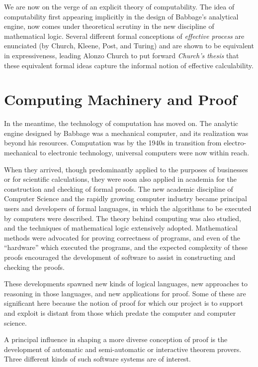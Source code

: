 We are now on the verge of an explicit theory of computability.
The idea of computability first appearing implicitly in the design of
Babbage's analytical engine, now comes under theoretical scrutiny in
the new discipline of mathematical logic.
Several different formal conceptions of \emph{effective process} are
enunciated (by Church, Kleene, Post, and
Turing) and are
shown to be equivalent in expressiveness, leading Alonzo Church to put
forward \emph{Church's thesis} that these equivalent formal ideas
capture the informal notion of effective calculability. 

\section{Computing Machinery and Proof}

In the meantime, the technology of computation has moved on.
The analytic engine designed by Babbage was a mechanical computer, and
its realization was beyond his resources.
Computation was by the 1940s in transition from electro-mechanical to
electronic technology, universal computers were now within reach.

When they arrived, though predominantly applied to the purposes of
businesses or for scientific calculations, they were soon also applied
in academia for the construction and checking of formal proofs.
The new academic discipline of Computer Science and the rapidly
growing computer industry became principal users and developers of
formal languages, in which the algorithms to be executed by computers
were described.
The theory behind computing was also studied, and the techniques of
mathematical logic extensively adopted.
Mathematical methods were advocated for proving correctness of
programs, and even of the ``hardware'' which executed the programs,
and the expected complexity of these proofs encouraged the development
of software to assist in constructing and checking the proofs.

These developments spawned new kinds of logical languages, new
approaches to reasoning in those languages, and new applications for
proof.
Some of these are significant here because the notion of proof for
which our project is to support and exploit is distant from those
which predate the computer and computer science.

A principal influence in shaping a more diverse conception of proof is
the development of automatic and semi-automatic or interactive theorem
provers.
Three different kinds of such software systems are of interest.

